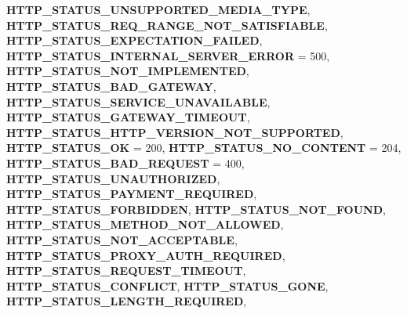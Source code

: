 \begin{DoxyCompactItemize}
{\bfseries H\+T\+T\+P\+\_\+\+S\+T\+A\+T\+U\+S\+\_\+\+U\+N\+S\+U\+P\+P\+O\+R\+T\+E\+D\+\_\+\+M\+E\+D\+I\+A\+\_\+\+T\+Y\+PE}, 
\newline
{\bfseries H\+T\+T\+P\+\_\+\+S\+T\+A\+T\+U\+S\+\_\+\+R\+E\+Q\+\_\+\+R\+A\+N\+G\+E\+\_\+\+N\+O\+T\+\_\+\+S\+A\+T\+I\+S\+F\+I\+A\+B\+LE}, 
{\bfseries H\+T\+T\+P\+\_\+\+S\+T\+A\+T\+U\+S\+\_\+\+E\+X\+P\+E\+C\+T\+A\+T\+I\+O\+N\+\_\+\+F\+A\+I\+L\+ED}, 
{\bfseries H\+T\+T\+P\+\_\+\+S\+T\+A\+T\+U\+S\+\_\+\+I\+N\+T\+E\+R\+N\+A\+L\+\_\+\+S\+E\+R\+V\+E\+R\+\_\+\+E\+R\+R\+OR} = 500, 
{\bfseries H\+T\+T\+P\+\_\+\+S\+T\+A\+T\+U\+S\+\_\+\+N\+O\+T\+\_\+\+I\+M\+P\+L\+E\+M\+E\+N\+T\+ED}, 
\newline
{\bfseries H\+T\+T\+P\+\_\+\+S\+T\+A\+T\+U\+S\+\_\+\+B\+A\+D\+\_\+\+G\+A\+T\+E\+W\+AY}, 
{\bfseries H\+T\+T\+P\+\_\+\+S\+T\+A\+T\+U\+S\+\_\+\+S\+E\+R\+V\+I\+C\+E\+\_\+\+U\+N\+A\+V\+A\+I\+L\+A\+B\+LE}, 
{\bfseries H\+T\+T\+P\+\_\+\+S\+T\+A\+T\+U\+S\+\_\+\+G\+A\+T\+E\+W\+A\+Y\+\_\+\+T\+I\+M\+E\+O\+UT}, 
{\bfseries H\+T\+T\+P\+\_\+\+S\+T\+A\+T\+U\+S\+\_\+\+H\+T\+T\+P\+\_\+\+V\+E\+R\+S\+I\+O\+N\+\_\+\+N\+O\+T\+\_\+\+S\+U\+P\+P\+O\+R\+T\+ED}, 
\newline
{\bfseries H\+T\+T\+P\+\_\+\+S\+T\+A\+T\+U\+S\+\_\+\+OK} = 200, 
{\bfseries H\+T\+T\+P\+\_\+\+S\+T\+A\+T\+U\+S\+\_\+\+N\+O\+\_\+\+C\+O\+N\+T\+E\+NT} = 204, 
{\bfseries H\+T\+T\+P\+\_\+\+S\+T\+A\+T\+U\+S\+\_\+\+B\+A\+D\+\_\+\+R\+E\+Q\+U\+E\+ST} = 400, 
{\bfseries H\+T\+T\+P\+\_\+\+S\+T\+A\+T\+U\+S\+\_\+\+U\+N\+A\+U\+T\+H\+O\+R\+I\+Z\+ED}, 
\newline
{\bfseries H\+T\+T\+P\+\_\+\+S\+T\+A\+T\+U\+S\+\_\+\+P\+A\+Y\+M\+E\+N\+T\+\_\+\+R\+E\+Q\+U\+I\+R\+ED}, 
{\bfseries H\+T\+T\+P\+\_\+\+S\+T\+A\+T\+U\+S\+\_\+\+F\+O\+R\+B\+I\+D\+D\+EN}, 
{\bfseries H\+T\+T\+P\+\_\+\+S\+T\+A\+T\+U\+S\+\_\+\+N\+O\+T\+\_\+\+F\+O\+U\+ND}, 
{\bfseries H\+T\+T\+P\+\_\+\+S\+T\+A\+T\+U\+S\+\_\+\+M\+E\+T\+H\+O\+D\+\_\+\+N\+O\+T\+\_\+\+A\+L\+L\+O\+W\+ED}, 
\newline
{\bfseries H\+T\+T\+P\+\_\+\+S\+T\+A\+T\+U\+S\+\_\+\+N\+O\+T\+\_\+\+A\+C\+C\+E\+P\+T\+A\+B\+LE}, 
{\bfseries H\+T\+T\+P\+\_\+\+S\+T\+A\+T\+U\+S\+\_\+\+P\+R\+O\+X\+Y\+\_\+\+A\+U\+T\+H\+\_\+\+R\+E\+Q\+U\+I\+R\+ED}, 
{\bfseries H\+T\+T\+P\+\_\+\+S\+T\+A\+T\+U\+S\+\_\+\+R\+E\+Q\+U\+E\+S\+T\+\_\+\+T\+I\+M\+E\+O\+UT}, 
{\bfseries H\+T\+T\+P\+\_\+\+S\+T\+A\+T\+U\+S\+\_\+\+C\+O\+N\+F\+L\+I\+CT}, 
\newline
{\bfseries H\+T\+T\+P\+\_\+\+S\+T\+A\+T\+U\+S\+\_\+\+G\+O\+NE}, 
{\bfseries H\+T\+T\+P\+\_\+\+S\+T\+A\+T\+U\+S\+\_\+\+L\+E\+N\+G\+T\+H\+\_\+\+R\+E\+Q\+U\+I\+R\+ED}, 

\end{DoxyCompactItemize}
